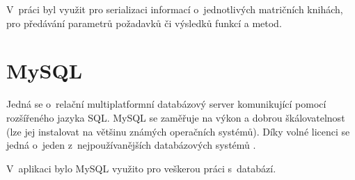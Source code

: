 V~práci byl využit pro serializaci informací o~jednotlivých matričních knihách, pro předávání parametrů požadavků či výsledků funkcí a metod.

\section{MySQL}
Jedná se o~relační multiplatformní databázový server komunikující pomocí rozšířeného jazyka SQL. MySQL se zaměřuje na výkon a dobrou škálovatelnost (lze jej instalovat na většinu známých operačních systémů). Díky volné licenci se jedná o~jeden z~nejpoužívanějších databázových systémů \cite{mysql}.

V~aplikaci bylo MySQL využito pro veškerou práci s~databází.